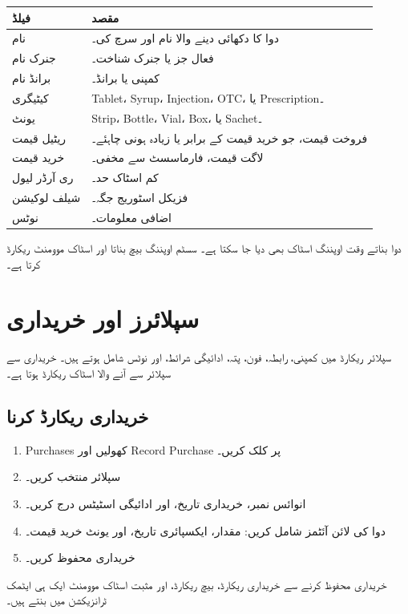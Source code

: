 \documentclass[12pt,a4paper]{article}
\begin{document}
\begin{longtable}{>{\raggedright\arraybackslash}p{4cm}>{\raggedright\arraybackslash}p{9cm}}
\toprule
\textbf{فیلڈ} & \textbf{مقصد} \\
\midrule
نام & دوا کا دکھائی دینے والا نام اور سرچ کی۔ \\
جنرک نام & فعال جز یا جنرک شناخت۔ \\
برانڈ نام & کمپنی یا برانڈ۔ \\
کیٹیگری & Tablet، Syrup، Injection، OTC، یا Prescription۔ \\
یونٹ & Strip، Bottle، Vial، Box، یا Sachet۔ \\
ریٹیل قیمت & فروخت قیمت، جو خرید قیمت کے برابر یا زیادہ ہونی چاہئے۔ \\
خرید قیمت & لاگت قیمت، فارماسسٹ سے مخفی۔ \\
ری آرڈر لیول & کم اسٹاک حد۔ \\
شیلف لوکیشن & فزیکل اسٹوریج جگہ۔ \\
نوٹس & اضافی معلومات۔ \\
\bottomrule
\end{longtable}

دوا بناتے وقت اوپننگ اسٹاک بھی دیا جا سکتا ہے۔ سسٹم اوپننگ بیچ بناتا اور اسٹاک موومنٹ ریکارڈ کرتا ہے۔

\section{سپلائرز اور خریداری}
سپلائر ریکارڈ میں کمپنی، رابطہ، فون، پتہ، ادائیگی شرائط، اور نوٹس شامل ہوتے ہیں۔ خریداری سے سپلائر سے آنے والا اسٹاک ریکارڈ ہوتا ہے۔

\subsection{خریداری ریکارڈ کرنا}
\begin{enumerate}
  \item Purchases کھولیں اور Record Purchase پر کلک کریں۔
  \item سپلائر منتخب کریں۔
  \item انوائس نمبر، خریداری تاریخ، اور ادائیگی اسٹیٹس درج کریں۔
  \item دوا کی لائن آئٹمز شامل کریں: مقدار، ایکسپائری تاریخ، اور یونٹ خرید قیمت۔
  \item خریداری محفوظ کریں۔
\end{enumerate}
خریداری محفوظ کرنے سے خریداری ریکارڈ، بیچ ریکارڈ، اور مثبت اسٹاک موومنٹ ایک ہی ایٹمک ٹرانزیکشن میں بنتے ہیں۔
\end{document}
